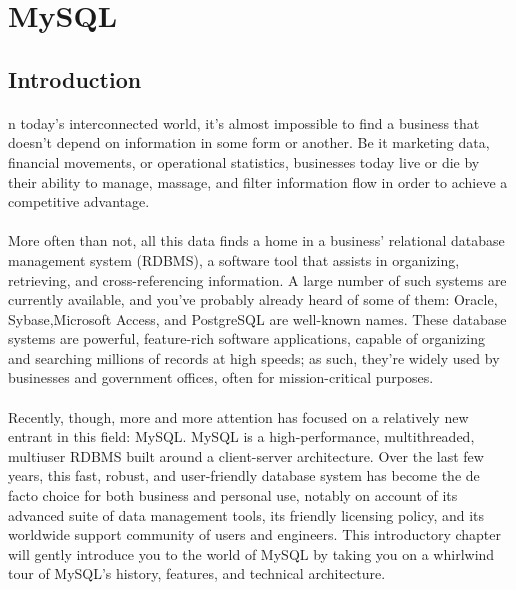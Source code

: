 \section{MySQL}
\subsection{Introduction}
\paragraph{}
n today’s interconnected world, it's almost impossible to find a business that doesn’t depend on information in some form or another. Be it marketing data, financial movements, or operational statistics, businesses today live or die by their ability to manage, massage, and filter information flow in order to achieve a competitive advantage.

\paragraph{}
More often than not, all this data finds a home in a business’ relational database management system (RDBMS), a software tool that assists in organizing, retrieving, and cross-referencing information. A large number of such systems are currently available, and you’ve probably already heard of some of them: Oracle, Sybase,Microsoft Access, and PostgreSQL are well-known names. These database systems are powerful, feature-rich software applications, capable of organizing and searching millions of records at high speeds; as such, they’re widely used by businesses and government offices, often for mission-critical purposes.

\paragraph{}
Recently, though, more and more attention has focused on a relatively new entrant in this field: MySQL. MySQL is a high-performance, multithreaded, multiuser RDBMS built around a client-server architecture. Over the last few years, this fast, robust, and user-friendly database system has become the de facto choice for both business and personal use, notably on account of its advanced suite of data management tools, its friendly licensing policy, and its worldwide support community of users and engineers. This introductory chapter will gently introduce you to the world of MySQL by taking you on a whirlwind tour of MySQL’s history, features, and technical architecture.

